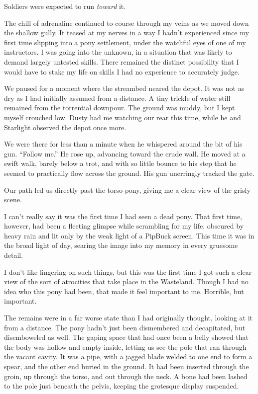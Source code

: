 Soldiers were expected to run \textit{toward} it.

The chill of adrenaline continued to course through my veins as we moved down the shallow gully. It teased at my nerves in a way I hadn’t experienced since my first time slipping into a pony settlement, under the watchful eyes of one of my instructors. I was going into the unknown, in a situation that was likely to demand largely untested skills. There remained the distinct possibility that I would have to stake my life on skills I had no experience to accurately judge.

We paused for a moment where the streambed neared the depot. It was not as dry as I had initially assumed from a distance. A tiny trickle of water still remained from the torrential downpour. The ground was muddy, but I kept myself crouched low. Dusty had me watching our rear this time, while he and Starlight observed the depot once more.

We were there for less than a minute when he whispered around the bit of his gun. “Follow me.” He rose up, advancing toward the crude wall. He moved at a swift walk, barely below a trot, and with so little bounce to his step that he seemed to practically flow across the ground. His gun unerringly tracked the gate.

Our path led us directly past the torso-pony, giving me a clear view of the grisly scene.

I can’t really say it was the first time I had seen a dead pony. That first time, however, had been a fleeting glimpse while scrambling for my life, obscured by heavy rain and lit only by the weak light of a PipBuck screen. This time it was in the broad light of day, searing the image into my memory in every gruesome detail.

I don’t like lingering on such things, but this was the first time I got such a clear view of the sort of atrocities that take place in the Wasteland. Though I had no idea who this pony had been, that made it feel important to me. Horrible, but important.

The remains were in a far worse state than I had originally thought, looking at it from a distance. The pony hadn’t just been dismembered and decapitated, but disemboweled as well. The gaping space that had once been a belly showed that the body was hollow and empty inside, letting us see the pole that ran through the vacant cavity. It was a pipe, with a jagged blade welded to one end to form a spear, and the other end buried in the ground. It had been inserted through the groin, up through the torso, and out through the neck. A bone had been lashed to the pole just beneath the pelvis, keeping the grotesque display suspended.

